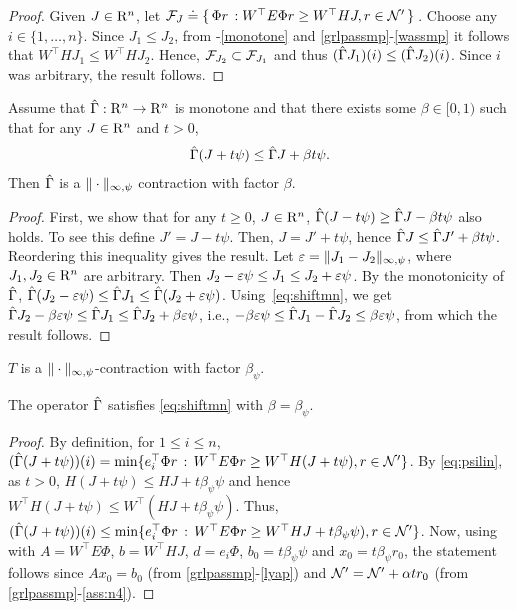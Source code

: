 \begin{proof}
Given $J\in \mathrm{R}^n$, let $\mathcal{F}_J\doteq\{\,\Phi r\,: W^\top E \Phi r\geq W^\top HJ, r\in \mathcal{N}'\,\}\,$. Choose any $i\in \{1, \ldots, n\}$. Since $J_1\leq J_2$, from -\eqref{monotone} and \cref{grlpassmp}-\eqref{wassmp} it follows that $W^\top H J_1\leq W^\top H J_2$. Hence, $\mathcal{F}_{J_2} \subset \mathcal{F}_{J_1}$ and thus $(\hat{\Gamma} J_1)(i) \le (\hat{\Gamma} J_2)(i)$.  Since $i$ was arbitrary, the result follows.
\end{proof}
\begin{lemma}\label{maxnormmn}
Assume that $\hat{\Gamma}: \mathrm{R}^n \to \mathrm{R}^n$ is monotone and 
that there exists some $\beta\in [0,1)$ such that for any $J\in \mathrm{R}^n$ and $t>0$,
\begin{align}
\label{eq:shiftmn}
\hg( J + t \psi) \le \hg J + \beta t \psi.
\end{align} 
Then $\hat{\Gamma}$ is a $\|\cdot\|_{\infty,\psi}$ contraction with factor $\beta$.
\end{lemma}
\begin{proof}
First, we show that for any $t\ge 0$,  $J\in \mathrm{R}^n$,
$\hat{\Gamma}( J - t \psi) \ge \hat{\Gamma} J - \beta t \psi$ also holds.
To see this define $J' = J-t\psi$. Then, $J = J'+t\psi$, hence $\hat{\Gamma} J \le \hat{\Gamma} J' + \beta t \psi$. Reordering this inequality gives the result.
Let $\varepsilon = \|J_1 - J_2\|_{\infty,\psi}$, where $J_1,J_2\in \mathrm{R}^n$ are arbitrary.
Then $J_2 - \varepsilon \psi \le J_1 \le J_2 + \varepsilon \psi$. 
By the monotonicity of $\hat{\Gamma}$,
$\hat{\Gamma}(J_2 - \varepsilon \psi) \le \hat{\Gamma} J_1 \le \hat{\Gamma}(J_2 + \varepsilon \psi)$. 
Using~\eqref{eq:shiftmn}, we get 
$\hat{\Gamma} J_2 - \beta \varepsilon \psi \le \hat{\Gamma} J_1 \le \hat{\Gamma} J_2 + \beta \varepsilon \psi$, i.e., $-\beta \varepsilon \psi \le \hat{\Gamma} J_1 - \hat{\Gamma} J_2 \le \beta \varepsilon \psi$, from which the result follows.
\end{proof}
\begin{corollary}\label{tmaxnormmn}
$T$ is a $\|\cdot\|_{\infty,\psi}$-contraction with factor $\beta_{\psi}$.
\end{corollary}
\begin{lemma}\label{gshiftmn}
The operator $\hat{\Gamma}$ satisfies \eqref{eq:shiftmn} with $\beta = \beta_\psi$.
\end{lemma}
\begin{proof}
By definition, for $1\le i \le n$, $(\hat{\Gamma} (J+t\psi) )(i) = \min\{ e_i^\top \Phi r \,:\, W^\top E\Phi r \ge W^\top H(J+t\psi), r\in \mathcal{N}' \}$.
By \eqref{eq:psilin}, as $t>0$, $H(J+t\psi) \le HJ + t \beta_\psi \psi$ and hence $W^\top H(J+t\psi) \le W^\top (HJ + t \beta_\psi \psi)$. Thus,
$(\hat{\Gamma} (J+t\psi) )(i) \le 
 \min\{ e_i^\top \Phi r \,:\, W^\top E\Phi r \ge W^\top HJ+t\beta_\psi \psi), r\in \mathcal{N}' \}$.
Now, using  with $A=W^\top E \Phi$, $b=W^\top HJ$, $d=e_i\Phi$, $b_0=t\beta_\psi \psi$
and $x_0=t \beta_\psi r_0$, the statement follows since $A x_0 = b_0$ (from \cref{grlpassmp}-\eqref{lyap}) and $\mathcal{N}' = \mathcal{N}' + \alpha t r_0$ (from \cref{grlpassmp}-\eqref{ass:n4}).
\end{proof}
